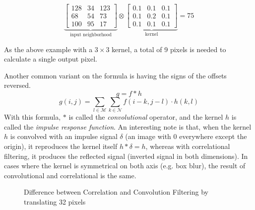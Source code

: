 \documentclass[twoside,a4paper,article]{combine}
\begin{document}
\[
\underbrace{
    \begin{bmatrix}
        128 & 34 & 123\\
        68 & 54 & 73 \\
        100 & 95 & 17
    \end{bmatrix}}_{\text{input neighborhood}}
\otimes
\underbrace{
    \begin{bmatrix}
        0.1 & 0.1 & 0.1\\
        0.1 & 0.2 & 0.1\\
        0.1 & 0.1 & 0.1
    \end{bmatrix}}_{\text{kernel}}
= 75
\]

As the above example with a $3 \times 3$ kernel, a total of 9 pixels is needed to calculate a single output pixel.

Another common variant on the formula is having the signs of the offsets reversed. 
\[
    g = f \ast h
\]
\[
    g(i,j) = \sum_{l \in \mathscr{M}}\sum_{k \in \mathscr{N}}{f(i-k, j-l) \cdot h(k, l)}
\]
With this formula, $\ast$ is called the \emph{convolutional} operator, and the kernel $h$ is called the \emph{impulse response function}. 
An interesting note is that, when the kernel $h$ is convolved with an impulse signal $\delta$ (an image with 0 everywhere except the origin),
it reproduces the kernel itself $h \ast \delta = h$, whereas with correlational filtering, 
it produces the reflected signal (inverted signal in both dimensions).\cite{Szeliski_2022} In cases
where the kernel is symmetrical on both axis (e.g. box blur), the result of convolutional and correlational is the same.

\begin{minipage}{\textwidth}\begin{figure}[H]
    \centering
    \caption{Difference between Correlation and Convolution Filtering by translating 32 pixels}
\end{figure}\end{minipage}
\end{document}
